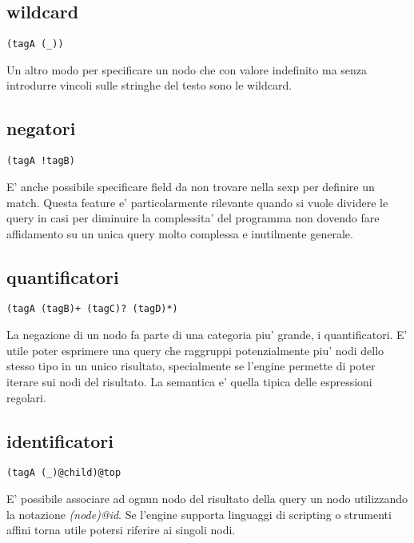\subsection{wildcard}

\begin{lstlisting}
(tagA (_))
\end{lstlisting}

Un altro modo per specificare un nodo che con valore indefinito ma senza introdurre vincoli sulle stringhe del testo sono le wildcard.

\subsection{negatori}

\begin{lstlisting}
(tagA !tagB)
\end{lstlisting}

E' anche possibile specificare field da non trovare nella sexp per definire un match.
Questa feature e' particolarmente rilevante quando si vuole dividere le query in casi per diminuire la complessita' del programma non dovendo fare affidamento su un unica query molto complessa e inutilmente generale.

\subsection{quantificatori}

\begin{lstlisting}
(tagA (tagB)+ (tagC)? (tagD)*)
\end{lstlisting}

La negazione di un nodo fa parte di una categoria piu' grande, i quantificatori.
E' utile poter esprimere una query che raggruppi potenzialmente piu' nodi dello stesso tipo in un unico risultato, specialmente se l'engine permette di poter iterare sui nodi del risultato.
La semantica e' quella tipica delle espressioni regolari.

\subsection{identificatori}

\begin{lstlisting}
(tagA (_)@child)@top
\end{lstlisting}

E' possibile associare ad ognun nodo del risultato della query un nodo utilizzando la notazione \emph{(node)@id}.
Se l'engine supporta linguaggi di scripting o strumenti affini torna utile potersi riferire ai singoli nodi.


